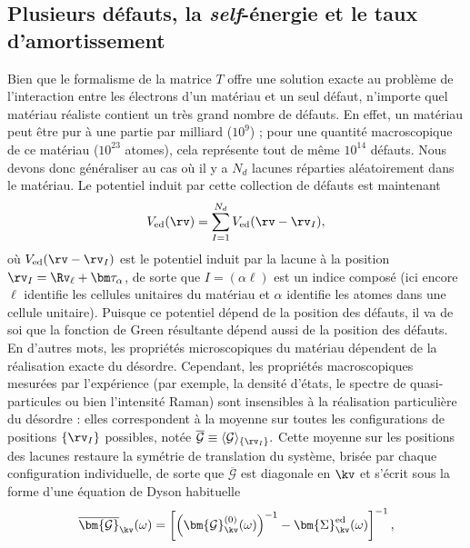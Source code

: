 \subsection{Plusieurs défauts, la \textit{self}-énergie et le taux d'amortissement}\label{sec:mbt_sigma}
Bien que le formalisme de la matrice $T$ offre une solution exacte au problème de l'interaction entre les électrons d'un matériau et un seul défaut, n'importe quel matériau réaliste contient un très grand nombre de défauts. En effet, un matériau peut être pur à une partie par milliard ($10^9$) ; pour une quantité macroscopique de ce matériau ($10^{23}$ atomes), cela représente tout de même $10^{14}$ défauts. Nous devons donc généraliser au cas où il y a $N_d$ lacunes réparties aléatoirement dans le matériau. Le potentiel induit par cette collection de défauts est maintenant
\begin{equation}
    V_\text{ed}(\rv) = \sum_{I=1}^{N_d}V_\text{ed}(\rv-\rv_I),
\end{equation}
où $V_\text{ed}(\rv-\rv_I)$ est le potentiel induit par la lacune à la position $\rv_I=\Rv_\ell+\bm\tau_\alpha$, de sorte que $I=(\alpha\ell)$ est un indice composé (ici encore $\ell$ identifie les cellules unitaires du matériau et $\alpha$ identifie les atomes dans une cellule unitaire). Puisque ce potentiel dépend de la position des défauts, il va de soi que la fonction de Green résultante dépend aussi de la position des défauts. En d'autres mots, les propriétés microscopiques du matériau dépendent de la réalisation exacte du désordre. Cependant, les propriétés macroscopiques mesurées par l'expérience (par exemple, la densité d'états, le spectre de quasi-particules ou bien l'intensité Raman) sont insensibles à la réalisation particulière du désordre : elles correspondent à la moyenne sur toutes les configurations de positions $\{\rv_I\}$ possibles, notée $\overline{\mathcal{G}}\equiv\langle\mathcal{G}\rangle_{\{\rv_I\}}.$ Cette moyenne sur les positions des lacunes restaure la symétrie de translation du système, brisée par chaque configuration individuelle, de sorte que $\overline{\mathcal{G}}$ est diagonale en $\kv$ et s'écrit sous la forme d'une équation de Dyson habituelle~\cite{mahanManyParticlePhysics2000}
\begin{equation}
    \overline{\bm{\mathcal{G}}}_{\kv}(\omega) = \left[\left(\bm{\mathcal{G}}^{(0)}_{\kv}(\omega)\right)^{-1}-\bm{\Sigma}_{\kv}^\text{ed}(\omega)\right]^{-1},\label{eqn:G_moyenne}
\end{equation}
